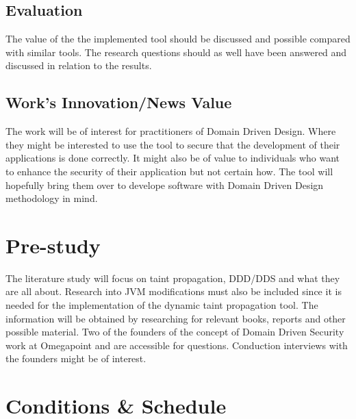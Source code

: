 \documentclass{../kththesis}
\begin{document}
\section{Evaluation}
The value of the the implemented tool should be discussed and possible compared with similar tools. The research questions should as well have been answered and discussed in relation to the results.


\section{Work's Innovation/News Value}
The work will be of interest for practitioners of Domain Driven Design. Where they might be interested to use the tool to secure that the development of their applications is done correctly. It might also be of value to individuals who want to enhance the security of their application but not certain how. The tool will hopefully bring them over to develope software with Domain Driven Design methodology in mind.



\chapter{Pre-study}
The literature study will focus on taint propagation, DDD/DDS and what they are all about. Research into JVM modifications must also be included since it is needed for the implementation of the dynamic taint propagation tool. The information will be obtained by researching for relevant books, reports and other possible material. Two of the founders of the concept of Domain Driven Security work at Omegapoint and are accessible for questions. Conduction interviews with the founders might be of interest.



\chapter{Conditions \& Schedule}
\end{document}
